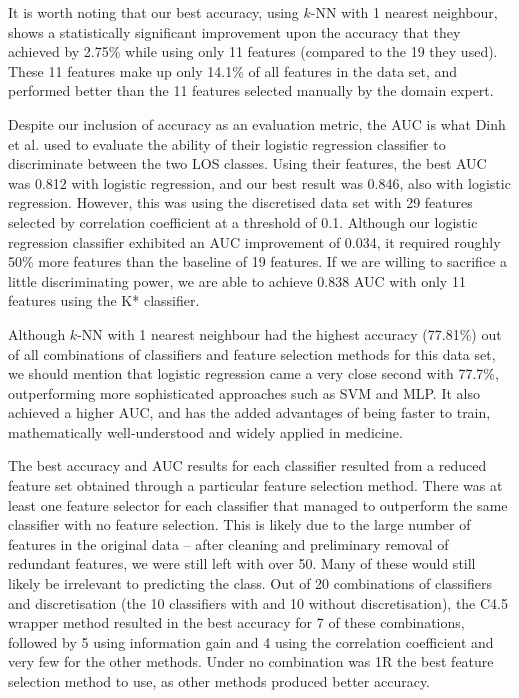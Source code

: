 \documentclass{article}
\begin{document}
It is worth noting that our best accuracy, using $k$-NN with 1
nearest neighbour, shows a statistically significant improvement upon the accuracy
that they achieved by 2.75\%
while using only 11 features (compared to the 19 they used). These 11 features
make up only 14.1\% of all features in the data set, and performed better than
the 11 features selected manually by the domain expert.

Despite our inclusion of accuracy as an evaluation metric, the AUC is what Dinh
et al. \cite{Dinh2013a}
used to evaluate the ability of their logistic regression classifier to
discriminate between the two LOS classes. Using their features, the best AUC
was 0.812 with logistic regression, and our best result was 0.846, also with
logistic regression. However, this was using the discretised data set with 29
features selected by correlation coefficient at a threshold of 0.1.
Although our logistic regression classifier exhibited an AUC improvement of
0.034, it required roughly 50\% more features than the baseline of 19 features.
If we are willing to sacrifice a little discriminating power, we are able to
achieve 0.838 AUC with only 11 features using the K* classifier.

Although $k$-NN with 1 nearest neighbour had the highest accuracy (77.81\%) out
of all combinations of classifiers and feature selection methods for this data
set, we should mention that logistic regression came a very close second with
77.7\%, outperforming more sophisticated approaches such as SVM and MLP. It
also achieved a higher AUC, and has the added advantages of being faster to
train, mathematically well-understood and widely applied in medicine.

The best accuracy and AUC results for
each classifier resulted from a reduced feature set obtained through a
particular feature selection method. There was at least one feature selector
for each classifier that managed to outperform the same classifier with
no feature selection. This is likely due to the large number of features in
the original data -- after cleaning and preliminary removal of redundant
features, we were still left with over 50. Many of these would still likely
be irrelevant to predicting the class.
Out of 20 combinations of classifiers
and discretisation (the 10 classifiers with and 10 without
discretisation), the C4.5 wrapper method resulted in the best
accuracy for 7 of these combinations, followed by 5 using information gain
and 4 using the correlation coefficient and very few for the other methods.
Under no combination was 1R the best feature selection method to use, as other
methods produced better accuracy.
\end{document}
